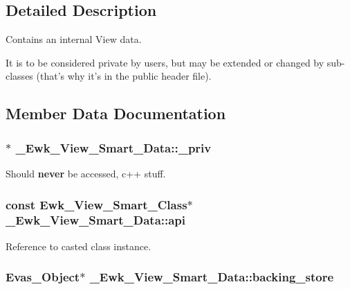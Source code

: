 \subsection{Detailed Description}
Contains an internal View data. 

It is to be considered private by users, but may be extended or changed by sub-\/classes (that's why it's in the public header file). 

\subsection{Member Data Documentation}
\hypertarget{struct__Ewk__View__Smart__Data_a848199f9944deae3466cadc11e24b7bb}{
\subsubsection[{\+\_\+priv}]{$\ast$ \+\_\+\+Ewk\+\_\+\+View\+\_\+\+Smart\+\_\+\+Data\+::\+\_\+priv}}\label{struct__Ewk__View__Smart__Data_a848199f9944deae3466cadc11e24b7bb}
Should {\bfseries never} be accessed, c++ stuff. \hypertarget{struct__Ewk__View__Smart__Data_a60c8e68092c52eb68f33f4b5a534ba92}{
\subsubsection[{api}]{\setlength{\rightskip}{0pt plus 5cm}const {\bf Ewk\+\_\+\+View\+\_\+\+Smart\+\_\+\+Class}$\ast$ \+\_\+\+Ewk\+\_\+\+View\+\_\+\+Smart\+\_\+\+Data\+::api}}\label{struct__Ewk__View__Smart__Data_a60c8e68092c52eb68f33f4b5a534ba92}
Reference to casted class instance. \hypertarget{struct__Ewk__View__Smart__Data_a993f767b62290c572d6d1d1697d291fa}{
\subsubsection[{backing\+\_\+store}]{\setlength{\rightskip}{0pt plus 5cm}Evas\+\_\+\+Object$\ast$ \+\_\+\+Ewk\+\_\+\+View\+\_\+\+Smart\+\_\+\+Data\+::backing\+\_\+store}}\label{struct__Ewk__View__Smart__Data_a993f767b62290c572d6d1d1697d291fa}
